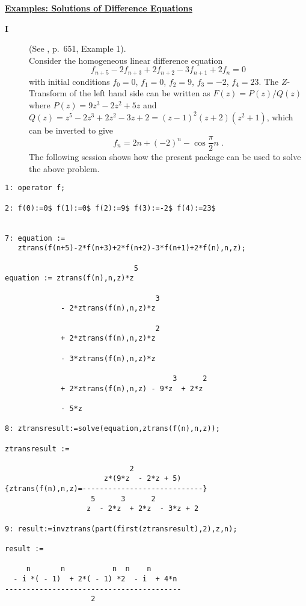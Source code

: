 \underline {\textbf{Examples: Solutions of Difference Equations}}

\begin{description}
\item[\textbf{I}] (See \cite{Bronstein:1981}, p.\ 651, Example 1).\\
  Consider the homogeneous linear difference equation
  \[ f_{n+5} - 2 f_{n+3} + 2 f_{n+2} - 3 f_{n+1} + 2 f_{n}=0 \]
  with initial conditions $f_0=0$, $f_1=0$, $f_2=9$, $f_3=-2$,
  $f_4=23$. The $Z$-Transform of the left hand side can be written as
  $F(z)=P(z)/Q(z)$ where $P(z)=9z^3-2z^2+5z$ and
  $Q(z)=z^5-2z^3+2z^2-3z+2=(z-1)^2(z+2)(z^2+1)$, which can be inverted
  to give
  \[ f_n = 2n + (-2)^n - \cos \frac{\pi}{2}n\;. \]
  The following \REDUCE session shows how the present package can be
  used to solve the above problem.
\end{description}

\begin{verbatim}
1: operator f;

2: f(0):=0$ f(1):=0$ f(2):=9$ f(3):=-2$ f(4):=23$


7: equation := 
   ztrans(f(n+5)-2*f(n+3)+2*f(n+2)-3*f(n+1)+2*f(n),n,z);

                              5
equation := ztrans(f(n),n,z)*z

                                   3
             - 2*ztrans(f(n),n,z)*z

                                   2
             + 2*ztrans(f(n),n,z)*z

             - 3*ztrans(f(n),n,z)*z

                                       3      2
             + 2*ztrans(f(n),n,z) - 9*z  + 2*z

             - 5*z

8: ztransresult:=solve(equation,ztrans(f(n),n,z));

ztransresult := 

                             2
                       z*(9*z  - 2*z + 5)
{ztrans(f(n),n,z)=----------------------------}
                    5      3      2
                   z  - 2*z  + 2*z  - 3*z + 2

9: result:=invztrans(part(first(ztransresult),2),z,n);

result := 

     n       n           n  n    n
  - i *( - 1)  + 2*( - 1) *2  - i  + 4*n
-----------------------------------------
                    2
\end{verbatim}

